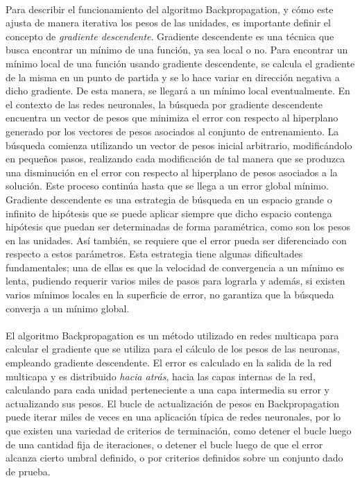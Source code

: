 \newpage %

\paragraph{}Para describir el funcionamiento del algoritmo Backpropagation, y cómo este ajusta de manera iterativa los pesos de las unidades, es importante definir el concepto de \textit{gradiente descendente}.
Gradiente descendente es una técnica que busca encontrar un mínimo de una función, ya sea local o no. 
Para encontrar un mínimo local de una función usando gradiente descendente, se calcula el gradiente de la misma en un punto de partida y se lo hace variar en dirección negativa a dicho gradiente.
De esta manera, se llegará a un mínimo local eventualmente.
En el contexto de las redes neuronales, la búsqueda por gradiente descendente encuentra un vector de pesos que minimiza el error con respecto al hiperplano generado por los vectores de pesos asociados al conjunto de entrenamiento.
La búsqueda comienza utilizando un vector de pesos inicial arbitrario, modificándolo en pequeños pasos, realizando cada modificación de tal manera que se produzca una disminución en el error con respecto al hiperplano de pesos asociados a la solución.
Este proceso continúa hasta que se llega a un error global mínimo.
Gradiente descendente es una estrategia de búsqueda en un espacio grande o infinito de hipótesis que se puede aplicar siempre que dicho espacio contenga hipótesis que puedan ser determinadas de forma paramétrica, como son los pesos en las unidades.
Así también, se requiere que el error pueda ser diferenciado con respecto a estos parámetros.
Esta estrategia tiene algunas dificultades fundamentales; una de ellas es que la velocidad de convergencia a un mínimo es lenta, pudiendo requerir varios miles de pasos para lograrla y además, si existen varios mínimos locales en la superficie de error, no garantiza que la búsqueda converja a un mínimo global.

\paragraph{}El algoritmo Backpropagation es un método utilizado en redes multicapa para calcular el gradiente que se utiliza para el cálculo de los pesos de las neuronas, empleando gradiente descendente.
El error es calculado en la salida de la red multicapa y es distribuido \textit{hacia atrás}, hacia las capas internas de la red, calculando para cada unidad perteneciente a una capa intermedia su error y actualizando sus pesos.
El bucle de actualización de pesos en Backpropagation puede iterar miles de veces en una aplicación típica de redes neuronales, por lo que existen una variedad de criterios de terminación, como detener el bucle luego de una cantidad fija de iteraciones, o detener el bucle luego de que el error alcanza cierto umbral definido, o por criterios definidos sobre un conjunto dado de prueba. 

